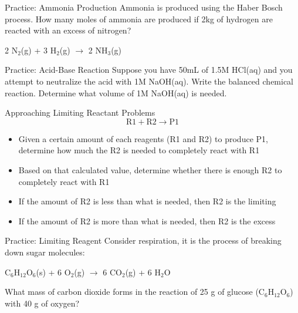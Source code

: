 \documentclass[11pt]{beamer}
\begin{document}
\begin{frame}{Practice: Ammonia Production}
  Ammonia is produced using the Haber Bosch process.
  How many moles of ammonia are produced if 2kg of hydrogen are reacted
  with an excess of nitrogen?

  2 N$_2$(g) + 3 H$_2$(g) $\rightarrow$ 2 NH$_3$(g)
  \vspace{1.2in}
\end{frame}

\begin{frame}{Practice: Acid-Base Reaction}
  Suppose you have 50mL of 1.5M HCl(aq) and you attempt to neutralize the
  acid with 1M NaOH(aq). Write the balanced chemical reaction. Determine
  what volume of 1M NaOH(aq) is needed.
  \vspace{1.2in}
\end{frame}

\begin{frame}{Approaching Limiting Reactant Problems}
  \begin{equation}
    \text{R1} + \text{R2} \rightarrow \text{P1}
  \end{equation}
  \begin{itemize}
  \item Given a certain amount of each reagents (R1 and R2)
    to produce P1, determine
    how much the R2 is needed to completely react with R1
  \item Based on that calculated value, determine whether
    there is enough R2 to completely react with R1
  \item If the amount of R2 is less than what is needed,
    then R2 is the limiting
  \item If the amount of R2 is more than what is needed,
    then R2 is the excess
  \end{itemize}
\end{frame}

\begin{frame}{Practice: Limiting Reagent}
  Consider respiration, it is the process of breaking down sugar molecules:

  C$_6$H$_{12}$O$_6$(s) + 6 O$_2$(g) $\rightarrow$ 6 CO$_2$(g) + 6 H$_2$O

  What mass of carbon dioxide forms in the reaction of 25 g of glucose
  (C$_6$H$_{12}$O$_6$) with 40 g of oxygen?
  \vspace{1.2in}
\end{frame}
\end{document}
